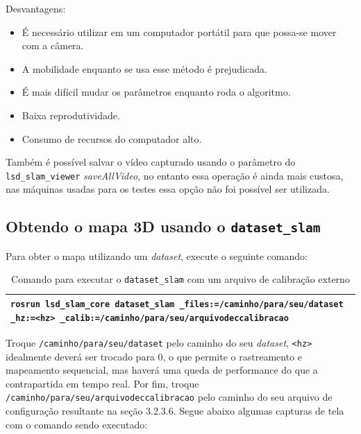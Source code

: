 Desvantagens:

\begin{itemize}
	\item{É necessário utilizar em um computador portátil para que possa-se mover com a câmera.}
	\item{A mobilidade enquanto se usa esse método é prejudicada.}
	\item{É mais difícil mudar os parâmetros enquanto roda o algoritmo.}
	\item{Baixa reprodutividade.}
	\item{Consumo de recursos do computador alto.}
\end{itemize}	

Também é possível salvar o vídeo capturado usando o parâmetro do \texttt{lsd\_slam\_viewer} \textit{saveAllVideo}, no entanto essa operação é ainda mais custosa, nas máquinas usadas para os testes essa opção não foi possível ser utilizada.

\subsection{Obtendo o mapa 3D usando o \texttt{dataset\_slam}}

Para obter o mapa utilizando um \textit{dataset}, execute o seguinte comando:

\begin{table}[!ht]\label{tb:16}
\begin{tabular}{| p{\textwidth}|}
\hline
\texttt{rosrun lsd\_slam\_core dataset\_slam \_files:=/caminho/para/seu/dataset \_hz:=<hz> \_calib:=/caminho/para/seu/arquivodeccalibracao}\\
\hline
\end{tabular}
\caption{Comando para executar o \texttt{dataset\_slam} com um arquivo de calibração externo}
\end{table}

Troque \texttt{/caminho/para/seu/dataset} pelo caminho do seu \textit{dataset}, \texttt{<hz>} idealmente deverá ser trocado para 0, o que permite o rastreamento e mapeamento sequencial, mas haverá uma queda de performance do que a contrapartida em tempo real. Por fim, troque \texttt{/caminho/para/seu/arquivodeccalibracao} pelo caminho do seu arquivo de configuração resultante na seção 3.2.3.6. Segue abaixo algumas capturas de tela com o comando sendo executado:

